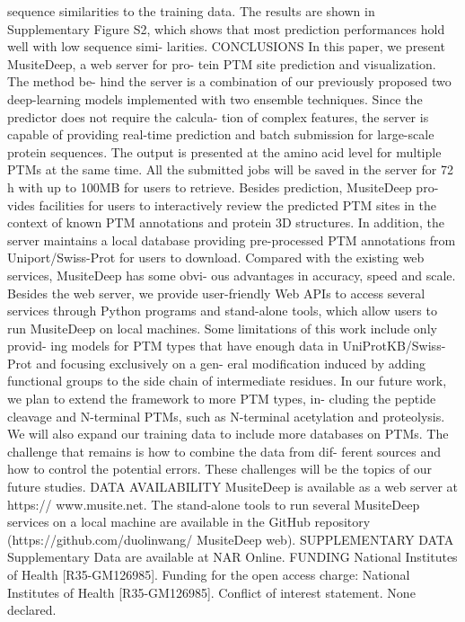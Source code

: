 sequence similarities to the training data. The results are
shown in Supplementary Figure S2, which shows that most
prediction performances hold well with low sequence simi-
larities.
CONCLUSIONS
In this paper, we present MusiteDeep, a web server for pro-
tein PTM site prediction and visualization. The method be-
hind the server is a combination of our previously proposed
two deep-learning models implemented with two ensemble
techniques. Since the predictor does not require the calcula-
tion of complex features, the server is capable of providing
real-time prediction and batch submission for large-scale
protein sequences. The output is presented at the amino acid
level for multiple PTMs at the same time. All the submitted
jobs will be saved in the server for 72 h with up to 100MB
for users to retrieve. Besides prediction, MusiteDeep pro-
vides facilities for users to interactively review the predicted
PTM sites in the context of known PTM annotations and
protein 3D structures. In addition, the server maintains a
local database providing pre-processed PTM annotations
from Uniport/Swiss-Prot for users to download. Compared
with the existing web services, MusiteDeep has some obvi-
ous advantages in accuracy, speed and scale. Besides the web
server, we provide user-friendly Web APIs to access several
services through Python programs and stand-alone tools,
which allow users to run MusiteDeep on local machines.
Some limitations of this work include only provid-
ing models for PTM types that have enough data in
UniProtKB/Swiss-Prot and focusing exclusively on a gen-
eral modification induced by adding functional groups to
the side chain of intermediate residues. In our future work,
we plan to extend the framework to more PTM types, in-
cluding the peptide cleavage and N-terminal PTMs, such as
N-terminal acetylation and proteolysis. We will also expand
our training data to include more databases on PTMs. The
challenge that remains is how to combine the data from dif-
ferent sources and how to control the potential errors. These
challenges will be the topics of our future studies.
DATA AVAILABILITY
MusiteDeep is available as a web server at https://
www.musite.net. The stand-alone tools to run several
MusiteDeep services on a local machine are available
in the GitHub repository (https://github.com/duolinwang/
MusiteDeep web).
SUPPLEMENTARY DATA
Supplementary Data are available at NAR Online.
FUNDING
National Institutes of Health [R35-GM126985]. Funding
for the open access charge: National Institutes of Health
[R35-GM126985].
Conflict of interest statement. None declared.
